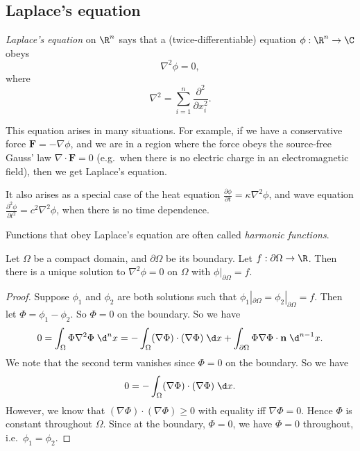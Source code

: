 \documentclass[a4paper]{article}
\begin{document}
\subsection{Laplace's equation}
\begin{defi}
  \emph{Laplace's equation} on $\R^n$ says that a (twice-differentiable) equation $\phi: \R^n \to \C$ obeys
  \[
    \nabla^2 \phi = 0,
  \]
  where
  \[
    \nabla^2 = \sum_{i = 1}^n \frac{\partial^2}{\partial x_i^2}.
  \]
\end{defi}
This equation arises in many situations. For example, if we have a conservative force $\mathbf{F} = -\nabla \phi$, and we are in a region where the force obeys the source-free Gauss' law $\nabla\cdot \mathbf{F} = 0$ (e.g.\ when there is no electric charge in an electromagnetic field), then we get Laplace's equation.

It also arises as a special case of the heat equation $\frac{\partial \phi}{\partial t} = \kappa \nabla^2 \phi$, and wave equation $\frac{\partial^2 \phi}{\partial t^2} = c^2 \nabla^2 \phi$, when there is no time dependence.

\begin{defi}
  Functions that obey Laplace's equation are often called \emph{harmonic functions}.
\end{defi}

\begin{prop}
  Let $\Omega$ be a compact domain, and $\partial \Omega$ be its boundary. Let $ f: \partial \Omega\to \R$. Then there is a unique solution to $\nabla^2 \phi = 0$ on $\Omega$ with $\phi|_{\partial \Omega} = f$.
\end{prop}

\begin{proof}
  Suppose $\phi_1$ and $\phi_2$ are both solutions such that $\phi_1|_{\partial \Omega} = \phi_2|_{\partial \Omega} = f$. Then let $\Phi = \phi_1 - \phi_2$. So $\Phi = 0$ on the boundary. So we have
  \[
    0 = \int_\Omega \Phi \nabla^2 \Phi \;\d^n x = -\int_\Omega (\nabla \Phi) \cdot (\nabla \Phi)\;\d x + \int_{\partial \Omega} \Phi \nabla \Phi\cdot \mathbf{n} \;\d^{n -1 }x.
  \]
  We note that the second term vanishes since $\Phi = 0$ on the boundary. So we have
  \[
    0 = -\int_\Omega (\nabla \Phi) \cdot (\nabla \Phi)\;\d x.
  \]
  However, we know that $(\nabla \Phi) \cdot (\nabla \Phi) \geq 0$ with equality iff $\nabla \Phi = 0$. Hence $\Phi$ is constant throughout $\Omega$. Since at the boundary, $\Phi = 0$, we have $\Phi = 0$ throughout, i.e.\ $\phi_1 = \phi_2$.
\end{proof}
\end{document}

